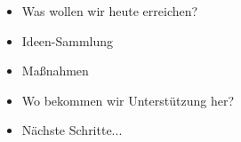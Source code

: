 \begin{itemize}
	\item 
		Was wollen wir heute erreichen? \pause 
	\item 
		Ideen-Sammlung \pause
	\item 
		Maßnahmen \pause
	\item 
		Wo bekommen wir Unterstützung her? \pause
	\item 
		Nächste Schritte...%
\end{itemize}